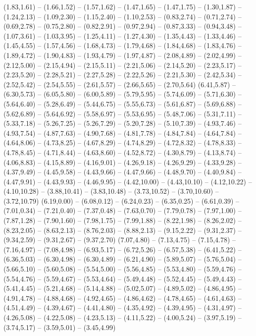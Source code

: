 \expandafter\def\csname geo:fluss:Mosel\endcsname{
  (1.83,1.61) -- (1.66,1.52) -- (1.57,1.62) -- (1.47,1.65) -- (1.47,1.75) -- (1.30,1.87) -- (1.24,2.13) -- (1.09,2.30) -- (1.15,2.40) -- (1.10,2.53) -- (0.83,2.74) -- (0.71,2.74) -- (0.69,2.78) -- (0.75,2.80) -- (0.82,2.91) -- (0.97,2.94) -- (0.87,3.33) -- (0.94,3.48) -- (1.07,3.61) -- (1.03,3.95) -- (1.25,4.11) -- (1.27,4.30) -- (1.35,4.43) -- (1.33,4.46) -- (1.45,4.55) -- (1.57,4.56) -- (1.68,4.73) -- (1.79,4.68) -- (1.84,4.68) -- (1.83,4.76) -- (1.89,4.72) -- (1.90,4.83) -- (1.93,4.79) -- (1.97,4.87) -- (2.08,4.89) -- (2.02,4.99) -- (2.12,5.00) -- (2.15,4.94) -- (2.15,5.11) -- (2.21,5.06) -- (2.14,5.20) -- (2.23,5.17) -- (2.23,5.20) -- (2.28,5.21) -- (2.27,5.28) -- (2.22,5.26) -- (2.21,5.30) -- (2.42,5.34) -- (2.52,5.42) -- (2.54,5.55) -- (2.61,5.57) -- (2.66,5.65) -- (2.70,5.64)}
\expandafter\def\csname geo:fluss:Weser\endcsname{
  (6.41,5.87) -- (6.30,5.73) -- (6.05,5.80) -- (6.00,5.89) -- (5.79,5.95) -- (5.74,6.09) -- (5.71,6.30) -- (5.64,6.40) -- (5.28,6.49) -- (5.44,6.75) -- (5.55,6.73) -- (5.61,6.87) -- (5.69,6.88) -- (5.62,6.89) -- (5.64,6.92) -- (5.58,6.97) -- (5.53,6.95) -- (5.48,7.06) -- (5.31,7.11) -- (5.33,7.18) -- (5.26,7.25) -- (5.26,7.29) -- (5.20,7.28) -- (5.10,7.39) -- (4.93,7.46) -- (4.93,7.54) -- (4.87,7.63) -- (4.90,7.68) -- (4.81,7.78) -- (4.84,7.84) -- (4.64,7.84) -- (4.64,8.06) -- (4.73,8.25) -- (4.67,8.29) -- (4.74,8.29) -- (4.72,8.32) -- (4.78,8.33) -- (4.78,8.45) -- (4.71,8.44) -- (4.63,8.60) -- (4.52,8.72) -- (4.30,8.79) -- (4.13,8.74) -- (4.06,8.83) -- (4.15,8.89) -- (4.16,9.01) -- (4.26,9.18) -- (4.26,9.29) -- (4.33,9.28) -- (4.37,9.49) -- (4.45,9.58) -- (4.43,9.66) -- (4.47,9.66) -- (4.48,9.70) -- (4.40,9.84) -- (4.47,9.91) -- (4.43,9.93) -- (4.46,9.95) -- (4.42,10.00) -- (4.43,10.10) -- (4.12,10.22) -- (4.10,10.28) -- (3.88,10.41) -- (3.83,10.48) -- (3.73,10.52) -- (3.70,10.60) -- (3.72,10.79)}
\expandafter\def\csname geo:fluss:Inn\endcsname{
  (6.19,0.00) -- (6.08,0.12) -- (6.24,0.23) -- (6.35,0.25) -- (6.61,0.39) -- (7.01,0.34) -- (7.21,0.40) -- (7.37,0.48) -- (7.63,0.70) -- (7.79,0.78) -- (7.97,1.00) -- (7.87,1.28) -- (7.90,1.60) -- (7.98,1.75) -- (7.99,1.88) -- (8.22,1.98) -- (8.26,2.02) -- (8.23,2.05) -- (8.63,2.13) -- (8.76,2.03) -- (8.88,2.13) -- (9.15,2.22) -- (9.31,2.37) -- (9.34,2.59) -- (9.31,2.67) -- (9.37,2.70)}
\expandafter\def\csname geo:fluss:Main\endcsname{
  (7.07,4.80) -- (7.13,4.75) -- (7.15,4.78) -- (7.16,4.97) -- (7.08,4.98) -- (6.93,5.17) -- (6.72,5.26) -- (6.57,5.38) -- (6.41,5.22) -- (6.36,5.03) -- (6.30,4.98) -- (6.30,4.89) -- (6.21,4.90) -- (5.89,5.07) -- (5.76,5.04) -- (5.66,5.10) -- (5.60,5.08) -- (5.54,5.00) -- (5.56,4.85) -- (5.53,4.80) -- (5.59,4.76) -- (5.54,4.76) -- (5.59,4.67) -- (5.53,4.64) -- (5.49,4.48) -- (5.52,4.45) -- (5.49,4.43) -- (5.41,4.45) -- (5.21,4.68) -- (5.14,4.88) -- (5.02,5.07) -- (4.89,5.02) -- (4.86,4.95) -- (4.91,4.78) -- (4.88,4.68) -- (4.92,4.65) -- (4.86,4.62) -- (4.78,4.65) -- (4.61,4.63) -- (4.51,4.49) -- (4.39,4.67) -- (4.41,4.80) -- (4.35,4.92) -- (4.39,4.95) -- (4.31,4.97) -- (4.26,5.08) -- (4.22,5.08) -- (4.23,5.13) -- (4.11,5.22) -- (4.00,5.24) -- (3.97,5.19) -- (3.74,5.17) -- (3.59,5.01) -- (3.45,4.99)}
